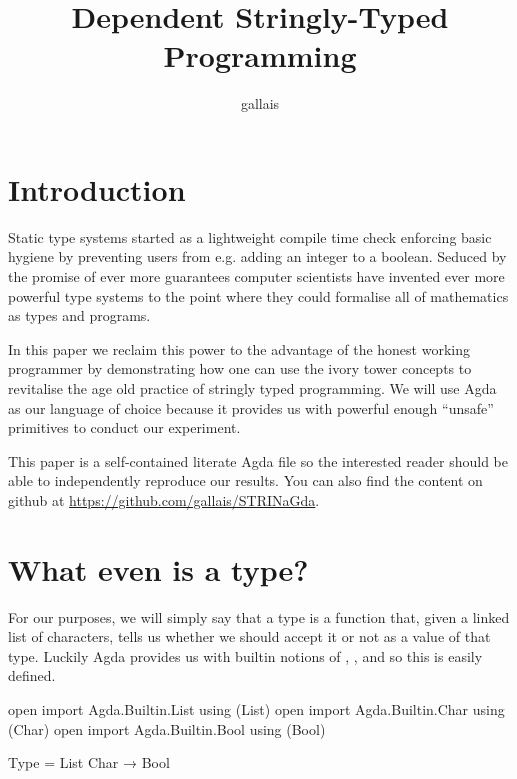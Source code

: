 \documentclass[twocolumn]{article}
\title{Dependent Stringly-Typed Programming}
\author{gallais}
\begin{document}
\maketitle

\section{Introduction}

Static type systems started as a lightweight compile time check enforcing
basic hygiene by preventing users from e.g. adding an integer to a boolean.
Seduced by the promise of ever more guarantees computer scientists have
invented ever more powerful type systems to the point where they could
formalise all of mathematics as types and programs.

In this paper we reclaim this power to the advantage of the honest working
programmer by demonstrating how one can use the ivory tower concepts to
revitalise the age old practice of stringly typed programming. We will use
Agda~\cite{norell2009dependently} as our language of choice
because it provides us with powerful enough
``unsafe'' primitives to conduct our experiment.

This paper is a self-contained literate Agda file so the interested reader
should be able to independently reproduce our results.
You can also find the content on github at
\url{https://github.com/gallais/STRINaGda}.

\section{What even is a type?}


For our purposes, we will simply say that a type is a function that, given a
linked list of characters, tells us whether we should accept it or not as a
value of that type.
%
Luckily Agda provides us with builtin notions of , ,
and  so this is easily defined.

\begin{code}
open import Agda.Builtin.List  using (List)
open import Agda.Builtin.Char  using (Char)
open import Agda.Builtin.Bool  using (Bool)

Type = List Char → Bool
\end{code}
\end{document}
